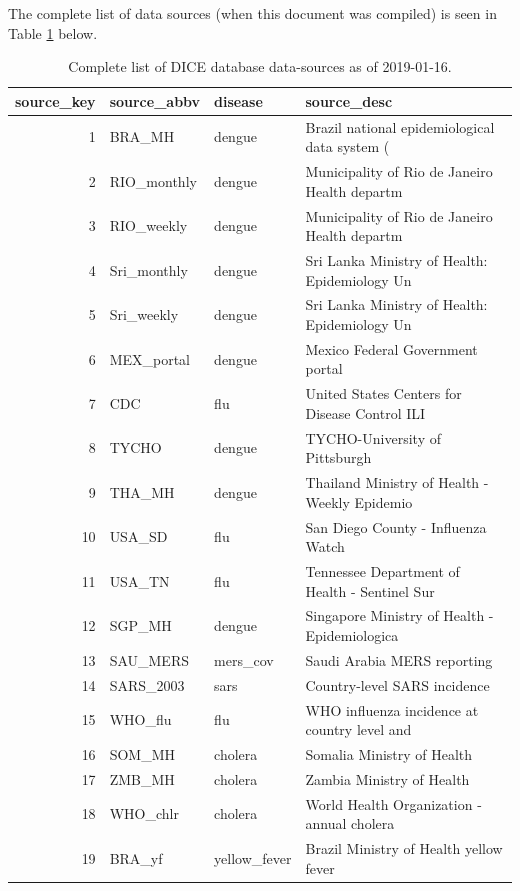 \documentclass[a4paper]{article}
\begin{document}
The complete list of data sources (when this document was compiled) is seen in Table \ref{tab:sources} below.
\begin{table}[ht]
\centering
\caption{Complete list of DICE database data-sources as of 2019-01-16.} 
\label{tab:sources}
\begin{tabular}{|r|l|l|l|}
  \hline
source\_key & source\_abbv & disease & source\_desc \\ 
  \hline
  1 & BRA\_MH & dengue & Brazil national epidemiological data system ( \\ 
    2 & RIO\_monthly & dengue & Municipality of Rio de Janeiro Health departm \\ 
    3 & RIO\_weekly & dengue & Municipality of Rio de Janeiro Health departm \\ 
    4 & Sri\_monthly & dengue & Sri Lanka Ministry of Health: Epidemiology Un \\ 
    5 & Sri\_weekly & dengue & Sri Lanka Ministry of Health: Epidemiology Un \\ 
    6 & MEX\_portal & dengue & Mexico Federal Government portal \\ 
    7 & CDC & flu & United States Centers for Disease Control ILI \\ 
    8 & TYCHO & dengue & TYCHO-University of Pittsburgh  \\ 
    9 & THA\_MH & dengue & Thailand Ministry of Health - Weekly Epidemio \\ 
   10 & USA\_SD & flu & San Diego County - Influenza Watch \\ 
   11 & USA\_TN & flu & Tennessee Department of Health - Sentinel Sur \\ 
   12 & SGP\_MH & dengue & Singapore Ministry of Health - Epidemiologica \\ 
   13 & SAU\_MERS & mers\_cov & Saudi Arabia MERS reporting \\ 
   14 & SARS\_2003 & sars & Country-level SARS incidence \\ 
   15 & WHO\_flu & flu & WHO influenza incidence at country level and  \\ 
   16 & SOM\_MH & cholera & Somalia Ministry of Health \\ 
   17 & ZMB\_MH & cholera & Zambia Ministry of Health \\ 
   18 & WHO\_chlr & cholera & World Health Organization - annual cholera \\ 
   19 & BRA\_yf & yellow\_fever & Brazil Ministry of Health yellow fever \\ 

\end{tabular}
\end{table}
\end{document}
